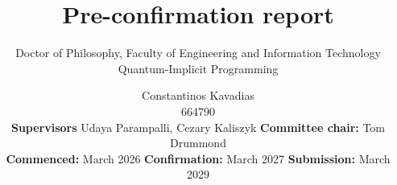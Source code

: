 \documentclass[a4]{scrartcl}
\begin{document}
    \title{Pre-confirmation report}
    \subtitle{Doctor of Philosophy, Faculty of Engineering and Information Technology \\ \small Quantum-Implicit Programming}
    \author{Constantinos Kavadias \\ \small 664790 \\ \footnotesize \textbf{Supervisors} Udaya Parampalli, Cezary Kaliszyk \quad\textbullet\quad \textbf{Committee chair:} Tom Drummond \\ \footnotesize \textbf{Commenced:} March 2026 \quad\textbullet\quad \textbf{Confirmation:} March 2027 \quad\textbullet\quad \textbf{Submission:} March 2029}

    \maketitle

    
    
    
    
    
    

    \printbibliography
\end{document}
